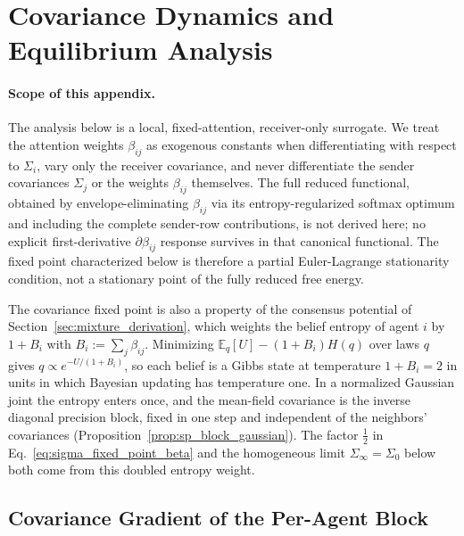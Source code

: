 \section{Covariance Dynamics and Equilibrium Analysis}
\label{app:covariance_dynamics}

\paragraph{Scope of this appendix.}
The analysis below is a local, fixed-attention, receiver-only surrogate. We treat the attention weights $\beta_{ij}$ as exogenous constants when differentiating with respect to $\Sigma_i$, vary only the receiver covariance, and never differentiate the sender covariances $\Sigma_j$ or the weights $\beta_{ij}$ themselves. The full reduced functional, obtained by envelope-eliminating $\beta_{ij}$ via its entropy-regularized softmax optimum and including the complete sender-row contributions, is not derived here; no explicit first-derivative $\partial\beta_{ij}$ response survives in that canonical functional. The fixed point characterized below is therefore a partial Euler-Lagrange stationarity condition, not a stationary point of the fully reduced free energy.

The covariance fixed point is also a property of the consensus potential of Section~\ref{sec:mixture_derivation}, which weights the belief entropy of agent $i$ by $1+B_i$ with $B_i := \sum_j\beta_{ij}$. Minimizing $\mathbb{E}_{q}[U] - (1+B_i)H(q)$ over laws $q$ gives $q \propto e^{-U/(1+B_i)}$, so each belief is a Gibbs state at temperature $1+B_i = 2$ in units in which Bayesian updating has temperature one. In a normalized Gaussian joint the entropy enters once, and the mean-field covariance is the inverse diagonal precision block, fixed in one step and independent of the neighbors' covariances (Proposition~\ref{prop:sp_block_gaussian}). The factor $\tfrac{1}{2}$ in Eq.~\eqref{eq:sigma_fixed_point_beta} and the homogeneous limit $\Sigma_\infty = \Sigma_0$ below both come from this doubled entropy weight.

\subsection{Covariance Gradient of the Per-Agent Block}

